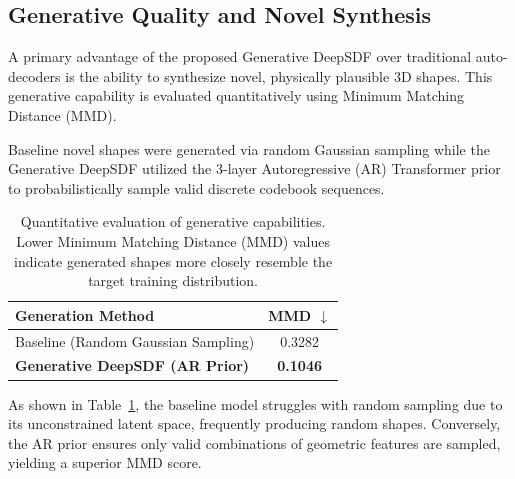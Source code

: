 \documentclass[11pt, a4paper]{article}
\begin{document}
\subsection{Generative Quality and Novel Synthesis}
A primary advantage of the proposed Generative DeepSDF over traditional auto-decoders is the ability to synthesize novel, physically plausible 3D shapes. This generative capability is evaluated quantitatively using Minimum Matching Distance (MMD).

Baseline novel shapes were generated via random Gaussian sampling while the Generative DeepSDF utilized the 3-layer Autoregressive (AR) Transformer prior to probabilistically sample valid discrete codebook sequences.

\begin{table}[htbp]
    \centering
    \caption{Quantitative evaluation of generative capabilities. Lower Minimum Matching Distance (MMD) values indicate generated shapes more closely resemble the target training distribution.}
    \begin{tabular}{lc}
        \hline
        \textbf{Generation Method} & \textbf{MMD $\downarrow$} \\
        \hline
        Baseline (Random Gaussian Sampling) & 0.3282 \\
        \textbf{Generative DeepSDF (AR Prior)} & \textbf{0.1046} \\
        \hline
    \end{tabular}
    \label{tab:mmd}
\end{table}

As shown in Table~\ref{tab:mmd}, the baseline model struggles with random sampling due to its unconstrained latent space, frequently producing random shapes. Conversely, the AR prior ensures only valid combinations of geometric features are sampled, yielding a superior MMD score. 
\end{document}
